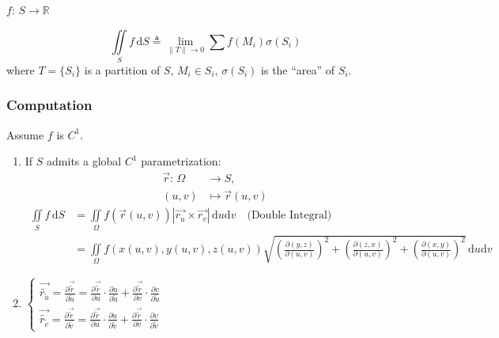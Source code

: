 $f:\,S\to\mathbb{R}$

$$\iint\limits_S f\,\mathrm{d}S\triangleq\lim_{\|T\|\to 0}\sum f(M_i)\sigma(S_i)$$
where $T=\{S_i\}$ is a partition of $S$, $M_i\in S_i$, $\sigma(S_i)$ is the ``area'' of $S_i$.

\subsubsection[数量场在曲面上的积分的计算]{Computation}

Assume $f$ is $C^1$.

\begin{enumerate}
    \item If $S$ admits a global $C^1$ parametrization:
          \begin{align*}
              \overrightarrow{r}:\,\Omega & \to S,                         \\
              (u,v)                       & \mapsto\overrightarrow{r}(u,v)
          \end{align*}
          \begin{align*}
              \iint\limits_S f\,\mathrm{d}S
               & =\iint\limits_\Omega f\left(\overrightarrow{r}(u,v)\right)\left|\overrightarrow{r_u}\times\overrightarrow{r_v}\right|\,\mathrm{d}u\mathrm{d}v\quad\text{(Double Integral)}                                                          \\
               & =\iint\limits_\Omega f(x(u,v),y(u,v),z(u,v))\sqrt{\left(\frac{\partial(y,z)}{\partial(u,v)}\right)^2+\left(\frac{\partial(z,x)}{\partial(u,v)}\right)^2+\left(\frac{\partial(x,y)}{\partial(u,v)}\right)^2}\,\mathrm{d}u\mathrm{d}v
          \end{align*}
    \item $\begin{cases}
                  \overrightarrow{\tilde{r_{\tilde{u}}}}=\frac{\partial\overrightarrow{\tilde{r}}}{\partial\tilde{u}}=\frac{\partial\overrightarrow{\tilde{r}}}{\partial u}\cdot\frac{\partial u}{\partial\tilde{u}}+\frac{\partial\overrightarrow{\tilde{r}}}{\partial v}\cdot\frac{\partial v}{\partial\tilde{u}} \\
                  \overrightarrow{\tilde{r_{\tilde{v}}}}=\frac{\partial\overrightarrow{\tilde{r}}}{\partial\tilde{v}}=\frac{\partial\overrightarrow{\tilde{r}}}{\partial u}\cdot\frac{\partial u}{\partial\tilde{v}}+\frac{\partial\overrightarrow{\tilde{r}}}{\partial v}\cdot\frac{\partial v}{\partial\tilde{v}}
              \end{cases}$


\end{enumerate}
